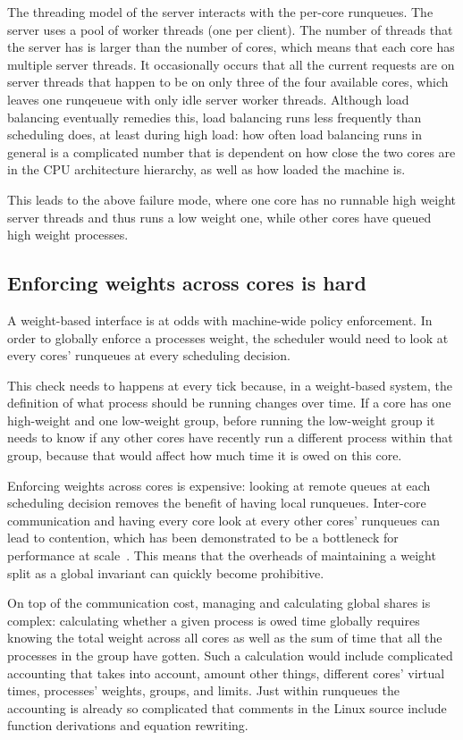 The threading model of the server interacts with the per-core runqueues. The
server uses a pool of worker threads (one per client). The number of threads
that the server has is larger than the number of cores, which means that each
core has multiple server threads. It occasionally occurs that all the current
requests are on server threads that happen to be on only three of the four
available cores, which leaves one runqeueue with only idle server worker
threads. Although load balancing eventually remedies this, load balancing runs
less frequently than scheduling does, at least during high load: how often load
balancing runs in general is a complicated number that is dependent on how close
the two cores are in the CPU architecture hierarchy, as well as how loaded the
machine is.

This leads to the above failure mode, where one core has no runnable high weight
server threads and thus runs a low weight one, while other cores have queued
high weight processes.

\subsection{Enforcing weights across cores is
hard}\label{ss:problem:cross-core-hard}

A weight-based interface is at odds with machine-wide policy enforcement. In
order to globally enforce a processes weight, the scheduler would need to
look at every cores' runqueues at every scheduling decision. 

This check needs to happens at every tick because, in a weight-based system, the
definition of what process should be running changes over time. If a core has
one high-weight and one low-weight group, before running the low-weight group it
needs to know if any other cores have recently run a different process within
that group, because that would affect how much time it is owed on this core.

Enforcing weights across cores is expensive: looking at remote queues at each
scheduling decision removes the benefit of having local runqueues. Inter-core
communication and having every core look at every other cores' runqueues can
lead to contention, which has been demonstrated to be a bottleneck for
performance at scale~\cite{afaas}. This means that the overheads of maintaining
a weight split as a global invariant can quickly become prohibitive.

On top of the communication cost, managing and calculating global shares is
complex: calculating whether a given process is owed time globally requires
knowing the total weight across all cores as well as the sum of time that all
the processes in the group have gotten. Such a calculation would include
complicated accounting that takes into account, amount other things, different
cores' virtual times, processes' weights, groups, and limits. Just within
runqueues the accounting is already so complicated that comments in the Linux
source include function derivations and equation rewriting.


